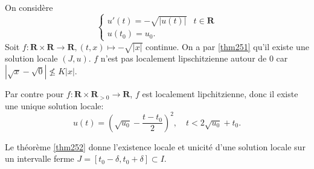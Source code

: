 \begin{example}
On considère
$$
\begin{cases}
u'(t)=-\sqrt{ |u(t)| } & t\in \mathbf{R} \\
u(t_{0})=u_{0}.
\end{cases}
$$
Soit $f:\mathbf{R}\times \mathbf{R}\to \mathbf{R},(t,x)\mapsto -\sqrt{ |x| }$ continue. On a par \ref{thm251} qu'il existe une solution locale $(J,u)$. $f$ n'est pas localement lipschitzienne autour de 0 car $|\sqrt{ x }-\sqrt{ 0 }|\nleq K|x|$. 

Par contre pour $f:\mathbf{R}\times \mathbf{R}_{>0}\to \mathbf{R}$, $f$ est localement lipchitzienne, donc il existe une unique solution locale:
$$
u(t)=\left( \sqrt{ u_{0} }-\frac{t-t_{0}}{2} \right)^{2},\quad t< 2\sqrt{ u_{0} }+t_{0}.
$$
\end{example}

Le théorème \ref{thm252} donne l'existence locale et unicité d'une solution locale sur un intervalle ferme $J=[t_{0}-\delta,t_{0}+\delta]\subset I$.